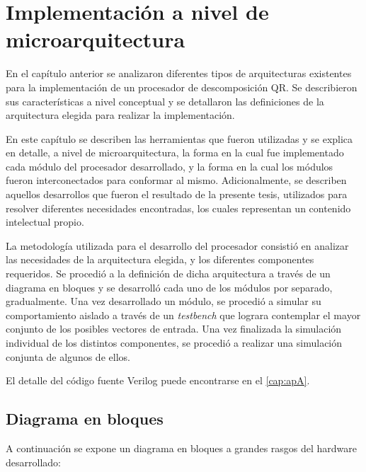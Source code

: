 \chapter{Implementación a nivel de microarquitectura}

En el capítulo anterior se analizaron diferentes tipos de arquitecturas existentes para la implementación de un procesador de descomposición QR. Se describieron sus características a nivel conceptual y se detallaron las definiciones de la arquitectura elegida para realizar la implementación.

En este capítulo se describen las herramientas que fueron utilizadas y se explica en detalle, a nivel de microarquitectura, la forma en la cual fue implementado cada módulo del procesador desarrollado, y la forma en la cual los módulos fueron interconectados para conformar al mismo. Adicionalmente, se describen aquellos desarrollos que fueron el resultado de la presente tesis, utilizados para resolver diferentes necesidades encontradas, los cuales representan un contenido intelectual propio.

La metodología utilizada para el desarrollo del procesador consistió en analizar las necesidades de la arquitectura elegida, y los diferentes componentes requeridos. Se procedió a la definición de dicha arquitectura a través de un diagrama en bloques y se desarrolló cada uno de los módulos por separado, gradualmente. Una vez desarrollado un módulo, se procedió a simular su comportamiento aislado a través de un \textit{testbench} que lograra contemplar el mayor conjunto de los posibles vectores de entrada. Una vez finalizada la simulación individual de los distintos componentes, se procedió a realizar una simulación conjunta de algunos de ellos.

El detalle del código fuente Verilog puede encontrarse en el \autoref{cap:apA}.

\section{Diagrama en bloques}

A continuación se expone un diagrama en bloques a grandes rasgos del hardware desarrollado:

